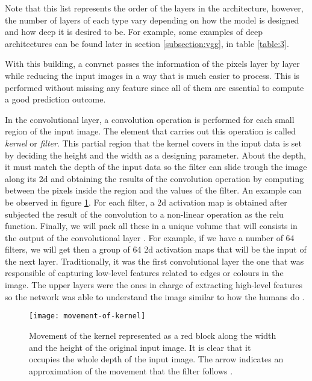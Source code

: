 	Note that this list represents the order of the layers in the architecture, however, the number of layers of each type vary depending on how the model is designed and how deep it is desired to be. For example, some examples of deep architectures can be found later in section \ref{subsection:vgg}, in table \ref{table:3}.
	
	With this building, a \acrlong{convnet} passes the information of the pixels layer by layer while reducing the input images in a way that is much easier to process. This is performed without missing any feature since all of them are essential to compute a good prediction outcome.
	
	In the convolutional layer, a convolution operation is performed for each small region of the input image. The element that carries out this operation is called \textit{kernel} or \textit{filter}. This partial region that the kernel covers in the input data is set by deciding the height and the width as a designing parameter. About the depth, it must match the depth of the input data so the filter can slide trough the image along its 2\acrshort{d} and obtaining the results of the convolution operation by computing between the pixels inside the region and the values of the filter. An example can be observed in figure \ref{fig:mesh11}. For each filter, a 2\acrshort{d} activation map is obtained after subjected the result of the convolution to a non-linear operation as the \acrfull{relu} function. Finally, we will pack all these in a unique volume that will consists in the output of the convolutional layer \cite{Karpathy2016}. For example, if we have a number of 64 filters, we will get then a group of 64 2\acrshort{d} activation maps that will be the input of the next layer. Traditionally, it was the first convolutional layer the one that was responsible of capturing low-level features related to edges or colours in the image. The upper layers were the ones in charge of extracting high-level features so the network was able to understand the image similar to how the humans do \cite{Saha2018}.
	
	\begin{figure}[ht]
		\centering
		\captionsetup{justification=centering}
		\texttt{[image: movement-of-kernel]}
		\caption{Movement of the kernel represented as a red block along the width and the height of the original input image. It is clear that it occupies the whole depth of the input image. The arrow indicates an approximation of the movement that the filter follows \cite{Saha2018}.}
		\label{fig:mesh11}
	\end{figure}

